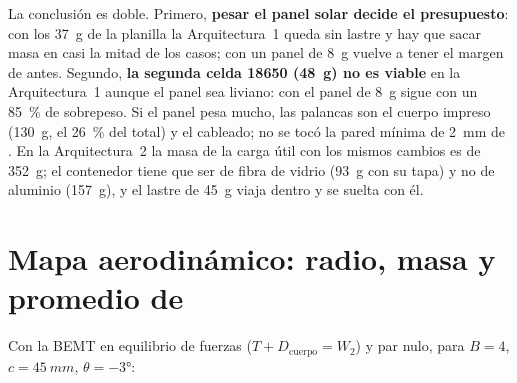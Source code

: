 La conclusión es doble. Primero, \textbf{pesar el panel solar decide el presupuesto}: con los
\SI{37}{g} de la planilla la Arquitectura~1 queda sin lastre y hay que sacar masa en casi la mitad de los casos; con un panel de \SI{8}{g}
vuelve a tener el margen de antes. Segundo, \textbf{la segunda celda 18650 (\SI{48}{g}) no es viable} en la
Arquitectura~1 aunque el panel sea liviano: con el panel de \SI{8}{g} sigue con un \SI{85}{\percent} de
sobrepeso. Si el panel pesa mucho, las palancas son el cuerpo impreso (\SI{130}{g}, el
\SI{26}{\percent} del total) y el cableado; no se tocó la pared mínima de \SI{2}{mm} de . En la
Arquitectura~2 la masa de la carga útil con los mismos cambios es de \SI{352}{g}; el contenedor
tiene que ser de fibra de vidrio (\SI{93}{g} con su tapa) y no de aluminio (\SI{157}{g}), y el lastre de
\SI{45}{g} viaja dentro y se suelta con él.

\section{Mapa aerodinámico: radio, masa y promedio de \texorpdfstring{}{C4}}\label{sec:arq-mapa}

Con la BEMT en equilibrio de fuerzas ($T+D_\text{cuerpo}=W_2$) y par nulo, para
$B=4$, $c=\SI{45}{mm}$, $\theta=\ang{-3}$:

